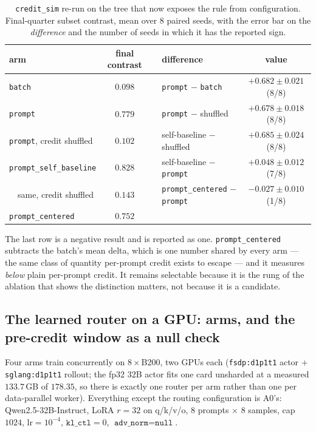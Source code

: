 \begin{table}[t]
\centering\small
\caption{\texttt{credit\_sim} re-run on the tree that now exposes the rule from configuration.
Final-quarter subset contrast, mean over $8$ paired seeds, with the error bar on the
\emph{difference} and the number of seeds in which it has the reported sign.}
\label{tab:creditrepro}
\begin{tabular}{lc c lc}
\toprule
arm & final contrast & \quad & difference & value \\
\midrule
\texttt{batch}                       & $0.098$ & & \texttt{prompt} $-$ \texttt{batch}    & $+0.682 \pm 0.021$ (8/8) \\
\texttt{prompt}                      & $0.779$ & & \texttt{prompt} $-$ shuffled          & $+0.678 \pm 0.018$ (8/8) \\
\texttt{prompt}, credit shuffled     & $0.102$ & & self-baseline $-$ shuffled           & $+0.685 \pm 0.024$ (8/8) \\
\texttt{prompt\_self\_baseline}      & $\mathbf{0.828}$ & & self-baseline $-$ \texttt{prompt} & $+0.048 \pm 0.012$ (7/8) \\
\ \ same, credit shuffled            & $0.143$ & & \texttt{prompt\_centered} $-$ \texttt{prompt} & $-0.027 \pm 0.010$ (1/8) \\
\texttt{prompt\_centered}            & $0.752$ & & & \\
\bottomrule
\end{tabular}
\end{table}

The last row is a negative result and is reported as one. \texttt{prompt\_centered} subtracts the
batch's mean delta, which is one number shared by every arm --- the same class of quantity
per-prompt credit exists to escape --- and it measures \emph{below} plain per-prompt credit. It
remains selectable because it is the rung of the ablation that shows the distinction matters, not
because it is a candidate.

\subsection{The learned router on a GPU: arms, and the pre-credit window as a null check}
\label{sec:m8arms}

Four arms train concurrently on $8\times$B200, two GPUs each (\texttt{fsdp:d1p1t1} actor +
\texttt{sglang:d1p1t1} rollout; the fp32 $32$B actor fits one card unsharded at a measured
$133.7$\,GB of $178.35$, so there is exactly one router per arm rather than one per data-parallel
worker). Everything except the routing configuration is A0's: Qwen2.5-32B-Instruct, LoRA $r{=}32$
on q/k/v/o, $8$ prompts $\times$ $8$ samples, cap $1024$, $\mathrm{lr}=10^{-4}$,
$\texttt{kl\_ctl}=0$, $\texttt{adv\_norm}=\texttt{null}$.

